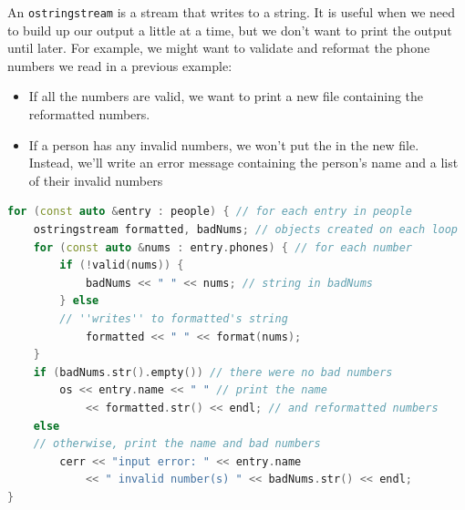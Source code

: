 An \texttt{ostringstream} is a stream that writes to a string. It is useful when we need to 
build up our output a little at a time, but we don't want to print the output until later.
For example, we might want to validate and reformat the phone numbers we read in a previous
example:

\begin{itemize}
    \item If all the numbers are valid, we want to print a new file containing the reformatted 
    numbers.
    \item If a person has any invalid numbers, we won't put the in the new file. Instead, we'll 
    write an error message containing the person's name and a list of their invalid numbers 
\end{itemize}

\begin{lstlisting}[language=C++]
for (const auto &entry : people) { // for each entry in people
    ostringstream formatted, badNums; // objects created on each loop
    for (const auto &nums : entry.phones) { // for each number
        if (!valid(nums)) {
            badNums << " " << nums; // string in badNums
        } else
        // ''writes'' to formatted's string
            formatted << " " << format(nums);
    }
    if (badNums.str().empty()) // there were no bad numbers
        os << entry.name << " " // print the name
            << formatted.str() << endl; // and reformatted numbers
    else
    // otherwise, print the name and bad numbers
        cerr << "input error: " << entry.name
            << " invalid number(s) " << badNums.str() << endl;
}
\end{lstlisting}







